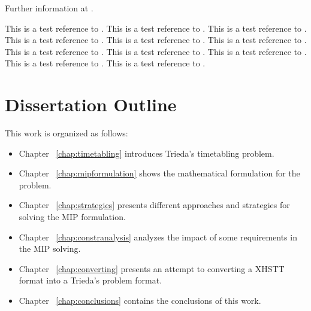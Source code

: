 Further information at \cite{Mista}.


This is a test reference to \cite{Carter2001}.    %
This is a test reference to \cite{Murray2007}.    %
This is a test reference to \cite{Unitime}.       %
This is a test reference to \cite{DSS}.           %
This is a test reference to \cite{Guenalay2006}.  %
This is a test reference to \cite{Schaerf99}.  		%
This is a test reference to \cite{Michael2002}.   %
This is a test reference to \cite{SchoolOverview2010}.   %
This is a test reference to \cite{Birbas2009}.    %
This is a test reference to \cite{Mimosasoftware}.
This is a test reference to \cite{Eventmap}.





\section{Dissertation Outline}
This work is organized as follows: 
\begin{itemize}
	\item Chapter ~\ref{chap:timetabling} introduces Trieda's timetabling problem.
	\item Chapter ~\ref{chap:mipformulation} shows the mathematical formulation for the problem.
	\item Chapter ~\ref{chap:strategies} presents different approaches and strategies for solving the MIP formulation.
	\item Chapter ~\ref{chap:constranalysis} analyzes the impact of some requirements in the MIP solving.
	\item Chapter ~\ref{chap:converting} presents an attempt to converting a XHSTT format into a Trieda's problem format.
	\item Chapter ~\ref{chap:conclusions} contains the conclusions of this work.
\end{itemize}